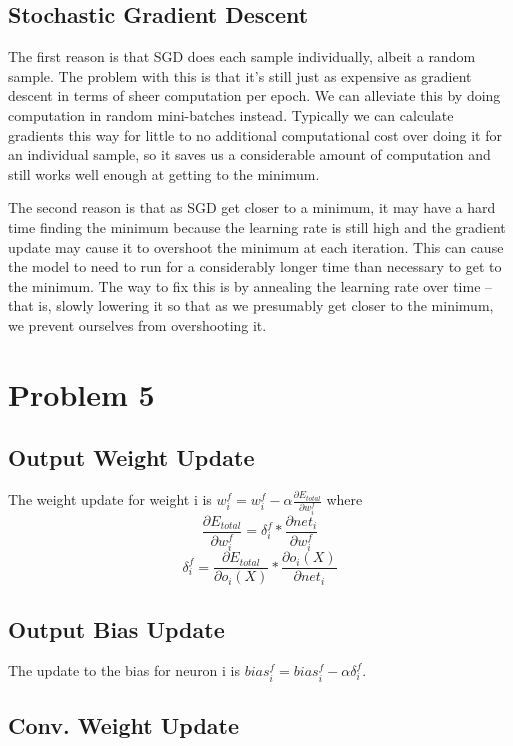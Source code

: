 \documentclass[12pt]{article}
\begin{document}
\subsection{Stochastic Gradient Descent}

The first reason is that SGD does each sample individually, albeit a random sample.
The problem with this is that it's still just as expensive as gradient descent in terms
 of sheer computation per epoch.
We can alleviate this by doing computation in random mini-batches instead.
Typically we can calculate gradients this way for little to no additional
 computational cost over doing it for an individual sample, so it saves us
 a considerable amount of computation and still works well enough at
 getting to the minimum.

The second reason is that as SGD get closer to a minimum, it may have a hard
 time finding the minimum because the learning rate is still high and
 the gradient update may cause it to overshoot the minimum at each iteration.
This can cause the model to need to run for a considerably longer time than
 necessary to get to the minimum.
The way to fix this is by annealing the learning rate over time -- that is,
 slowly lowering it so that as we presumably get closer to the minimum,
 we prevent ourselves from overshooting it.

\section{Problem 5}

\subsection{Output Weight Update}

The weight update for weight i is $w_i^f = w_i^f - \alpha \frac{\partial E_{total}}{\partial w_i^f}$
where
$$
\frac{\partial E_{total}}{\partial w_i^f} = \delta_i^f * \frac{\partial net_i}{\partial w_i^f}
$$
$$
\delta_i^f = \frac{\partial E_{total}}{\partial o_i(X)} * \frac{\partial o_i(X)}{\partial net_i}
$$

\subsection{Output Bias Update}

The update to the bias for neuron i is $bias_i^f = bias_i^f - \alpha \delta_i^f$.

\subsection{Conv. Weight Update}
\end{document}
